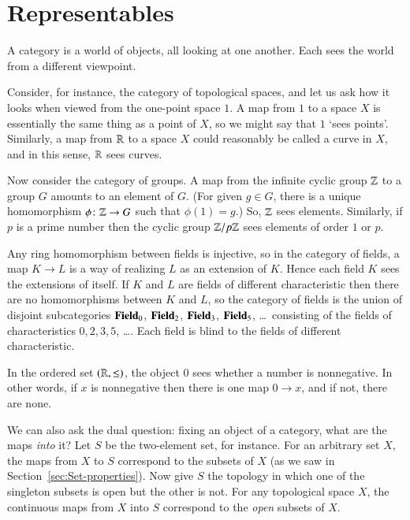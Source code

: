 %
%
%

\chapter{Representables}
\label{ch:rep}


A category is a world of objects, all looking at one another.  Each sees
the world from a different viewpoint.

Consider, for instance, the category of topological spaces, and let us ask
how it looks when viewed from the one-point space $1$.  A map from $1$ to a
space $X$ is essentially the same thing as a point of $X$, so we might say
that $1$ `sees%
%
%
points'.  Similarly, a map from $\mathbb{R}$ to a space $X$
could reasonably be called a curve in $X$, and in this sense, $\mathbb{R}$ sees
curves.

Now consider the category of groups.  A map from the infinite
cyclic group $\mathbb{Z}$%
%
%
to a group $G$ amounts to an element of $G$.  (For given $g \in G$, there
is a unique homomorphism $\phi\from \integers \to G$ such that $\phi(1) =
g$.)  So, $\mathbb{Z}$ sees elements.  Similarly, if $p$ is a prime number
then the cyclic group $\mathbb{Z}/p\mathbb{Z}$ sees elements of order $1$ or
$p$.

Any ring homomorphism between fields is injective, so in the category of
fields,%
%
%
a map $K \to L$ is a way of realizing $L$ as an extension of $K$.  Hence
each field $K$ sees the extensions of itself.  If $K$ and $L$ are fields of
different characteristic then there are no homomorphisms between $K$ and
$L$, so the category of fields is the union of disjoint subcategories
$\mathbf{Field}_0$, $\mathbf{Field}_2$, $\mathbf{Field}_3$, $\mathbf{Field}_5$, \ldots\ consisting of the
fields of characteristics $0, 2, 3, 5$, \ldots.  Each field is blind to the
fields of different characteristic.

In the ordered set $(\mathbb{R}, \mathord{\leq})$, the object $0$ sees whether
a number is nonnegative.  In other words, if $x$ is nonnegative then
there is one map $0 \to x$, and if not, there are none.

We can also ask the dual question: fixing an object of a category, what are
the maps \emph{into} it?  Let $S$ be the two-element set, for instance.
For an arbitrary set $X$, the maps from $X$ to $S$ correspond to the
subsets of $X$ (as we saw in Section~\ref{sec:Set-properties}).  Now give
$S$ the topology in which one of the singleton subsets is open but the
other is not.  For any topological space $X$, the continuous maps from $X$
into $S$ correspond to the \emph{open} subsets of $X$.

